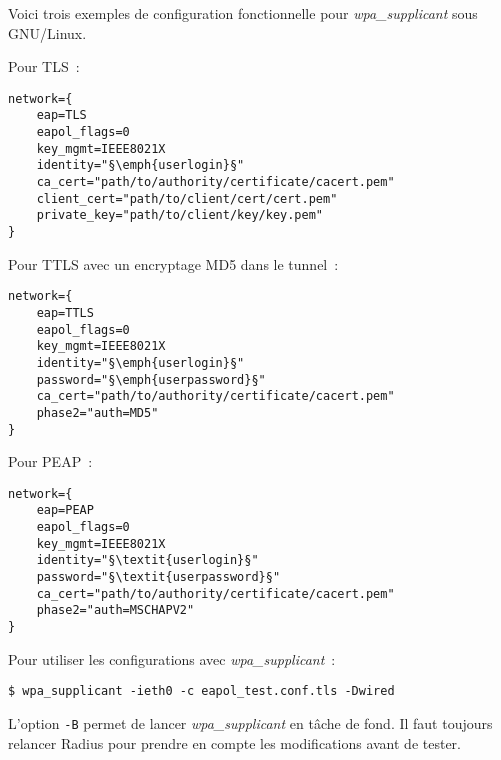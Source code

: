 Voici trois exemples de configuration fonctionnelle pour \emph{wpa\_supplicant} sous GNU/Linux. 

Pour TLS~:

\begin{lstlisting}
network={
    eap=TLS
    eapol_flags=0
    key_mgmt=IEEE8021X
    identity="§\emph{userlogin}§"
    ca_cert="path/to/authority/certificate/cacert.pem"
    client_cert="path/to/client/cert/cert.pem"
    private_key="path/to/client/key/key.pem"
}
\end{lstlisting}

Pour TTLS avec un encryptage MD5 dans le tunnel~:

\begin{lstlisting}
network={
    eap=TTLS
    eapol_flags=0
    key_mgmt=IEEE8021X
    identity="§\emph{userlogin}§"
    password="§\emph{userpassword}§"
    ca_cert="path/to/authority/certificate/cacert.pem"
    phase2="auth=MD5"
}
\end{lstlisting}

Pour PEAP~:

\begin{lstlisting}
network={
    eap=PEAP
    eapol_flags=0
    key_mgmt=IEEE8021X
    identity="§\textit{userlogin}§"
    password="§\textit{userpassword}§"
    ca_cert="path/to/authority/certificate/cacert.pem"
    phase2="auth=MSCHAPV2"
}
\end{lstlisting}

Pour utiliser les configurations avec \emph{wpa\_supplicant}~:

\begin{lstlisting}
$ wpa_supplicant -ieth0 -c eapol_test.conf.tls -Dwired
\end{lstlisting}

L'option \texttt{-B} permet de lancer \emph{wpa\_supplicant} en tâche de fond. Il faut toujours relancer Radius pour prendre en compte les modifications avant de tester.
